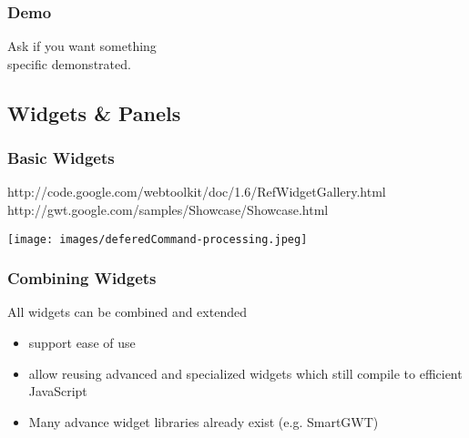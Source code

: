 \begin{frame}[red] %
\frametitle{Demo}

\huge 
\begin{center}Ask if you want something \\specific demonstrated.\end{center}
\end{frame}


\subsection{Widgets \& Panels}

\begin{frame}[red] %
\frametitle{Basic Widgets}
http://code.google.com/webtoolkit/doc/1.6/RefWidgetGallery.html\\
http://gwt.google.com/samples/Showcase/Showcase.html

\begin{center}
  \texttt{[image: images/deferedCommand-processing.jpeg]} 
\end{center}
\end{frame}

\begin{frame}[red] %
\frametitle{Combining Widgets}

All widgets can be combined and extended
\begin{itemize}
\item  support ease of use
\item  allow reusing advanced and specialized widgets which still compile to efficient JavaScript
\item Many advance widget libraries already exist (e.g. SmartGWT)
\end{itemize}

\end{frame}